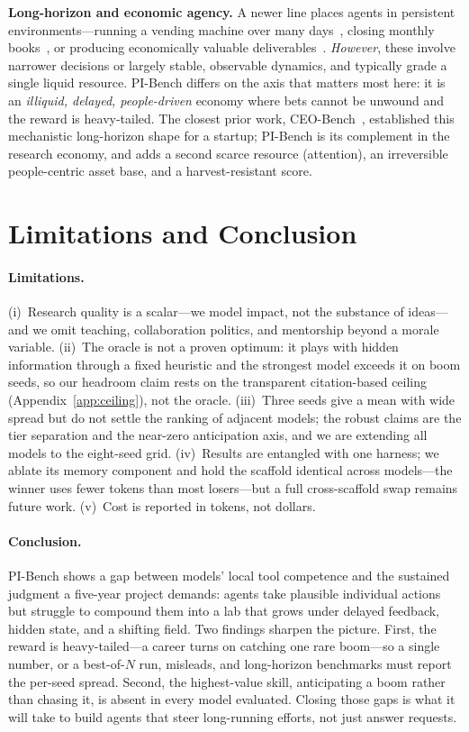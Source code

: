 \documentclass[11pt]{article}
\newcommand{\bench}{PI-Bench}
\begin{document}
\textbf{Long-horizon and economic agency.} A newer line places agents in persistent
environments---running a vending machine over many days~\citep{backlund2025vendingbench}, closing
monthly books~\citep{penrose2025accountingbench}, or producing economically valuable
deliverables~\citep{patwardhan2025gdpval}. \emph{However}, these involve narrower decisions or
largely stable, observable dynamics, and typically grade a single liquid resource. \bench{} differs
on the axis that matters most here: it is an \emph{illiquid, delayed, people-driven} economy where
bets cannot be unwound and the reward is heavy-tailed. The closest prior work,
CEO-Bench~\citep{chen2026ceobench}, established this mechanistic long-horizon shape for a startup;
\bench{} is its complement in the research economy, and adds a second scarce resource (attention),
an irreversible people-centric asset base, and a harvest-resistant score.

\section{Limitations and Conclusion}
\paragraph{Limitations.} (i)~Research quality is a scalar---we model impact, not the substance of
ideas---and we omit teaching, collaboration politics, and mentorship beyond a morale variable.
(ii)~The oracle is not a proven optimum: it plays with hidden information through a fixed heuristic
and the strongest model exceeds it on boom seeds, so our headroom claim rests on the transparent
citation-based ceiling (Appendix~\ref{app:ceiling}), not the oracle. (iii)~Three seeds give a mean
with wide spread but do not settle the ranking of adjacent models; the robust claims are the tier
separation and the near-zero anticipation axis, and we are extending all models to the eight-seed
grid. (iv)~Results are entangled with one harness; we ablate its memory component and hold the
scaffold identical across models---the winner uses fewer tokens than most losers---but a full
cross-scaffold swap remains future work. (v)~Cost is reported in tokens, not dollars.

\paragraph{Conclusion.} \bench{} shows a gap between models' local tool competence and the
sustained judgment a five-year project demands: agents take plausible individual actions but
struggle to compound them into a lab that grows under delayed feedback, hidden state, and a
shifting field. Two findings sharpen the picture. First, the reward is heavy-tailed---a career
turns on catching one rare boom---so a single number, or a best-of-$N$ run, misleads, and
long-horizon benchmarks must report the per-seed spread. Second, the highest-value skill,
anticipating a boom rather than chasing it, is absent in every model evaluated. Closing those gaps
is what it will take to build agents that steer long-running efforts, not just answer requests.
\end{document}
